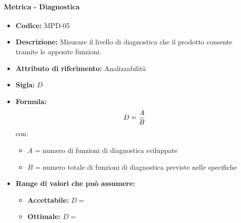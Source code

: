         \paragraph{Metrica - Diagnostica} 
           \begin{itemize}
          \item  \textbf{Codice:} MPD-05
          \item  \textbf{Descrizione:} Misurare il livello di diagnostica che il prodotto consente tramite le apposite funzioni.
          \item  \textbf{Attributo di riferimento:} Analizzabilità
         \item   \textbf{Sigla:} $D$
          \item  \textbf{Formula:} $$D = {A \over B}$$
          con:
          \begin{itemize}
            \item $A$ = numero di funzioni di diagnostica sviluppate
            \item $B$ = numero totale di funzioni di diagnostica previste nelle specifiche
          \end{itemize}

        \item \textbf{Range di valori che può assumere:}
        \begin{itemize}
            \item \textbf{Accettabile:} $D = $
            \item \textbf{Ottimale:} $D = $
        \end{itemize}
       \end{itemize}
              
\newpage %

